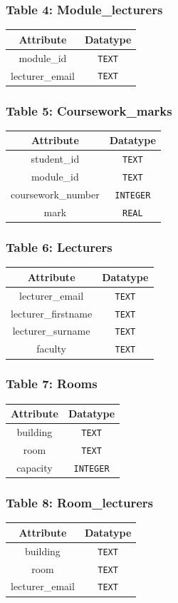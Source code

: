\subsubsection*{Table 4: Module_lecturers}
\begin{tabular}{|c|c|}
\hline
\textbf{Attribute} & \textbf{Datatype} \\ \hline
module_id & \verb|TEXT| \\ 
\hline
lecturer_email & \verb|TEXT| \\ 
\hline
\end{tabular}

\subsubsection*{Table 5: Coursework_marks}
\begin{tabular}{|c|c|}
\hline
\textbf{Attribute} & \textbf{Datatype} \\ \hline
student_id & \verb|TEXT| \\ 
\hline
module_id & \verb|TEXT| \\ 
\hline
coursework_number & \verb|INTEGER| \\ 
\hline
mark & \verb|REAL| \\
\hline
\end{tabular}

\subsubsection*{Table 6: Lecturers}
\begin{tabular}{|c|c|}
\hline
\textbf{Attribute} & \textbf{Datatype} \\ \hline
lecturer_email & \verb|TEXT| \\ 
\hline
lecturer_firstname & \verb|TEXT| \\ 
\hline
lecturer_surname & \verb|TEXT| \\ 
\hline
faculty & \verb|TEXT| \\
\hline
\end{tabular}

\subsubsection*{Table 7: Rooms}
\begin{tabular}{|c|c|}
\hline
\textbf{Attribute} & \textbf{Datatype} \\ \hline
building & \verb|TEXT| \\ 
\hline
room & \verb|TEXT| \\ 
\hline 
capacity & \verb|INTEGER| \\ 
\hline
\end{tabular}

\subsubsection*{Table 8: Room_lecturers}
\begin{tabular}{|c|c|}
\hline
\textbf{Attribute} & \textbf{Datatype} \\ \hline
building & \verb|TEXT| \\ 
\hline
room & \verb|TEXT| \\ 
\hline
lecturer_email & \verb|TEXT| \\ 
\hline
\end{tabular}